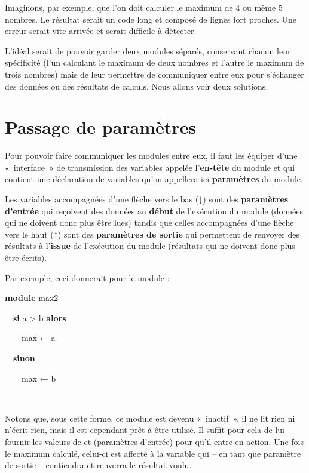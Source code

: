 {
Imaginons, par exemple, que l'on doit calculer le
maximum de 4 ou même 5 nombres. Le résultat serait un code long et
composé de lignes fort proches. Une erreur serait vite arrivée et
serait difficile à détecter.}

{
L’idéal serait de pouvoir garder deux modules séparés, conservant chacun
leur spécificité (l’un calculant le maximum de deux nombres et l’autre
le maximum de trois nombres) mais de leur permettre de communiquer
entre eux pour s’échanger des données ou des résultats de calculs. Nous
allons voir deux solutions.}

\section{Passage de paramètres}
{
Pour pouvoir faire communiquer les modules entre eux, il faut les
équiper d’une «~interface~» de transmission des variables appelée
l’\textbf{en-tête }du module et qui contient une déclaration de
variables qu’on appellera ici \textbf{paramètres} du module. }

{
Les variables accompagnées d’une flèche vers le bas (\textsf{↓}) sont
des \textbf{paramètres d’entrée} qui reçoivent des données au
\textbf{début} de l’exécution du module (données qui ne doivent donc
plus être lues) tandis que celles accompagnées d’une flèche vers le
haut (\textsf{↑}) sont des \textbf{paramètres de sortie} qui permettent
de renvoyer des résultats à l’\textbf{issue} de l’exécution du module
(résultats qui ne doivent donc plus être écrits). }


\bigskip

{
Par exemple, ceci donnerait pour le module  :}

{\sffamily
\textbf{module} max2}

{\sffamily
\ \ \textbf{si} a {\textgreater} b \textbf{alors}}

{\sffamily
\ \ \ \ max{ }{← a}}

{\sffamily
\ \ \textbf{sinon}}

{\sffamily
\ \ \ \ max{ }{← b}}

{\sffamily
\ \  }

{\sffamily
{}}

{
Notons que, sous cette forme, ce module est devenu «~inactif~», il ne
lit rien ni n’écrit rien, mais il est cependant prêt à être utilisé. Il
suffit pour cela de lui fournir les valeurs de  et
 (paramètres d’entrée) pour qu’il entre en action.
Une fois le maximum calculé, celui-ci est affecté à la variable
 qui – en tant que paramètre de sortie –
contiendra et renverra le résultat voulu. }

